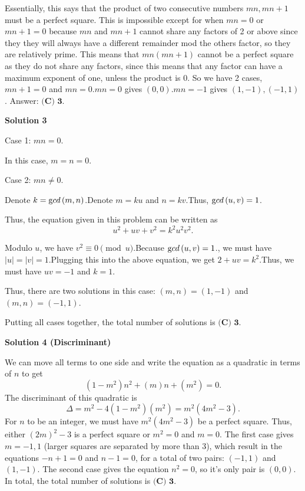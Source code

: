 \begin{enumerate}
 Essentially, this says that the product of two consecutive numbers $mn,mn+1$ must be a perfect square. This is impossible except for when $mn=0$ or $mn+1=0$ because $mn$ and $mn+1$ cannot share any factors of 2 or above since they they will always have a different remainder mod the others factor, so they are relatively prime. This means that $mn(mn+1)$ cannot be a perfect square as they do not share any factors, since this means that any factor can have a maximum exponent of one, unless the product is $0$. So we have 2 cases, $mn+1=0$ and $mn=0$.$mn=0$ gives $(0,0)$.$mn=-1$ gives $(1,-1), (-1,1)$. Answer: $\boxed{\textbf{(C) 3}}.$




\textbf{Solution 3}

Case 1: $mn = 0$.

 In this case, $m = n = 0$.

 Case 2: $mn \neq 0$.

 Denote $k = {\textrm gcd} \left( m, n \right)$.Denote $m = k u$ and $n = k v$.Thus, ${\textrm gcd} \left( u, v \right) = 1$.

 Thus, the equation given in this problem can be written as
 \[ u^2 + uv + v^2 = k^2 u^2 v^2 . \]

 Modulo $u$, we have $v^2 \equiv 0 \pmod{u}$.Because ${\textrm gcd} \left( u, v \right) = 1$., we must have $|u| = |v| = 1$.Plugging this into the above equation, we get $2 + uv = k^2$.Thus, we must have $uv = -1$ and $k = 1$.

 Thus, there are two solutions in this case: $\left( m , n \right) = \left( 1, -1 \right)$ and $\left( m , n \right) = \left( -1, 1 \right)$.

 Putting all cases together, the total number of solutions is $\boxed{\textbf{(C) 3}}$.

 



\textbf{Solution 4 (Discriminant)}

We can move all terms to one side and write the equation as a quadratic in terms of $n$ to get 
 \[(1-m^2)n^2+(m)n+(m^2)=0.\] The discriminant of this quadratic is 
 \[\Delta = m^2-4(1-m^2)(m^2)=m^2(4m^2-3).\] For $n$ to be an integer, we must have $m^2(4m^2-3)$ be a perfect square. Thus, either $(2m)^2-3$ is a perfect square or $m^2 = 0$ and $m = 0$. The first case gives $m=-1,1$ (larger squares are separated by more than 3), which result in the equations $-n+1=0$ and $n-1=0$, for a total of two pairs: $(-1,1)$ and $(1,-1)$. The second case gives the equation $n^2=0$, so it's only pair is $(0,0)$. In total, the total number of solutions is $\boxed{\textbf{(C) 3}}$.


\end{enumerate}
